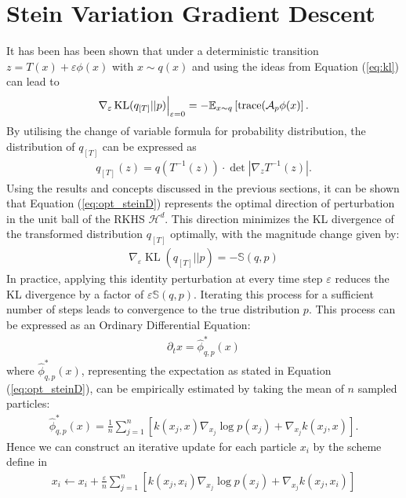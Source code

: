\documentclass[11pt]{isr} %
\newcommand{\so}{\mathcal{A}}
\newcommand{\hh}{\mathcal{H}^d}
\newcommand{\ee}[1]{\mathbb{E}_{x \sim #1}}
\DeclareMathOperator{\trace}{trace}
\DeclareMathOperator{\kl}{KL}
\begin{document}
\section*{Stein Variation Gradient Descent} 
It has been has been shown \cite{liu2019stein} that under a deterministic transition $z=T(x) + \varepsilon \phi(x)$ with $x \sim q(x)$ and using the ideas from Equation (\ref{eq:kl}) can lead to
\begin{align}
  \nabla_\varepsilon \kl( q_{\left[T\right]} || p ) \Big{|}_{\varepsilon= 0} = - \ee{q} \left[ \trace( \so_p \phi(x) \right]. 
\end{align}
By utilising the change of variable formula for probability distribution, the distribution of $q_{\left[T \right]}$ can be expressed as 
\begin{align*}
  q_{[T]}(z) = q \left( T^{-1} (z) \right) \cdot \det \left| \nabla_z T^{-1} (z) \right|.
\end{align*}
Using the results and concepts discussed in the previous sections, it can be shown that Equation (\ref{eq:opt_steinD}) represents the optimal direction of perturbation in the unit ball of the RKHS $\hh$. This direction minimizes the KL divergence of the transformed distribution $q_{[T]}$ optimally, with the magnitude change given by:
\begin{align}
  \nabla_\varepsilon \kl( q_{[T]} || p ) = - \mathbb{S}(q,p) 
\end{align}
In practice, applying this identity perturbation at every time step $\varepsilon$ reduces the KL divergence by a factor of $\varepsilon \mathbb{S}(q,p)$. Iterating this process for a sufficient number of steps leads to convergence to the true distribution $p$. This process can be expressed as an Ordinary Differential Equation:
\begin{align*}
  \partial_t x = \hat{\phi}_{q,p}^{*} (x)
\end{align*}
where $\hat{\phi}_{q,p}^{*} (x)$, representing the expectation as stated in Equation (\ref{eq:opt_steinD}), can be empirically estimated by taking the mean of $n$ sampled particles:
\begin{align*}
  \hat{\phi}_{q,p}^{*} (x) = \frac{1}{n} \sum_{j=1}^{n} \left[ k(x_j , x) \nabla_{x_j} \log p(x_j ) + \nabla_{x_j} k(x_j,x) \right].
\end{align*}
Hence we can construct an iterative update for each particle $x_i$ by the scheme define in \cite{liu2019stein}
\begin{align}
  x_i \leftarrow x_i + \frac{\varepsilon}{n} \sum_{j=1}^{n} \left[ k(x_j , x_i) \nabla_{x_j} \log p(x_j ) + \nabla_{x_j} k(x_j,x_i) \right]
  \label{eq:svgd_iter}
\end{align}
\end{document}
